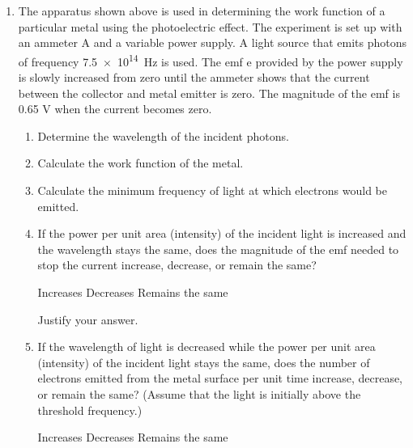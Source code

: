 \documentclass{../../../oss-apphys}
\begin{document}
\begin{enumerate}[leftmargin=15pt]
  \begin{center}
  \end{center}
\item The apparatus shown above is used in determining the work function of a
  particular metal using the photoelectric effect. The experiment is set up
  with an ammeter A and a variable power supply. A light source that emits
  photons of frequency \SI{7.5e14}{\hertz} is used. The emf e provided by the
  power supply is slowly increased from zero until the ammeter shows that the
  current between the collector and metal emitter is zero. The magnitude of the
  emf is 0.65 V when the current becomes zero.
  \begin{enumerate}[leftmargin=18pt]
  \item Determine the wavelength of the incident photons.
  \item Calculate the work function of the metal.
  \item Calculate the minimum frequency of light at which electrons would be
    emitted.
  \item If the power per unit area (intensity) of the incident light is
    increased and the wavelength stays the same, does the magnitude of the emf
    needed to stop the current increase, decrease, or remain the same?

    \vspace{.1in}
    \underline{\hspace{.3in}}Increases\vspace{.2in}
    \underline{\hspace{.3in}}Decreases\vspace{.2in}
    \underline{\hspace{.3in}}Remains the same

    \vspace{.1in}Justify your answer.\vspace{.5in}
    
  \item If the wavelength of light is decreased while the power per unit area
    (intensity) of the incident light stays the same, does the number of
    electrons emitted from the metal surface per unit time increase, decrease,
    or remain the same? (Assume that the light is initially above the threshold
    frequency.)

    \vspace{.1in}
    \underline{\hspace{.3in}}Increases\vspace{.2in}
    \underline{\hspace{.3in}}Decreases\vspace{.2in}
    \underline{\hspace{.3in}}Remains the same


\end{enumerate}
\end{enumerate}
\end{document}
